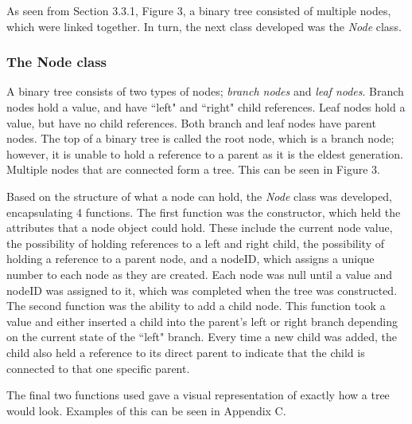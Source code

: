 \documentclass[11pt]{article}
\begin{document}
As seen from Section 3.3.1, Figure 3, a binary tree consisted of multiple nodes, which were linked together. In turn, the next class  developed was the \textit{Node} class. 
\subsubsection{The Node class}\label{subsubsec:node}
 A binary tree consists of two types of nodes; \textit{branch nodes} and \textit{leaf nodes}. Branch nodes hold a value, and have ``left" and ``right" child references. Leaf nodes hold a value, but have no child references. Both branch and leaf nodes have parent nodes. The top of a binary tree is called the root node, which is a branch node; however, it is unable to hold a reference to a parent as it is the eldest generation. Multiple nodes that are connected form a tree. This can be seen in Figure 3.  
 
Based on the structure of what a node can hold, the \textit{Node} class was developed, encapsulating 4 functions. The first function was the constructor, which held the attributes that a node object could hold. These include the current node value, the possibility of holding references to a left and right child, the possibility of holding a reference to a parent node, and a nodeID, which assigns a unique number to each node as they are created.
Each node was null until a value and nodeID was assigned to it, which was completed when the tree was constructed. The second function was the ability to add a child node. This function took a value and either inserted a child into the parent's left or right branch depending on the current state of the ``left" branch. Every time a new child was added, the child also held a reference to its direct parent to indicate that the child is connected to that one specific parent.
 
The final two functions used gave a visual representation of exactly how a tree would look. Examples of this can be seen in Appendix C. 
\end{document}
